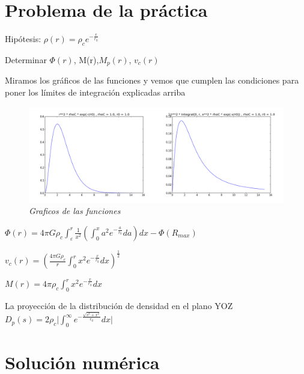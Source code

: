 \documentclass[12pt]{book}
\begin{document}
\section*{Problema de la práctica}
\begin{description}
\item Hipótesis: $\rho(r) = \rho_c e^{-\frac{r}{r_0}} $
\item Determinar $\Phi(r)$, M(r),$M_p(r)$, $v_c(r)$ 

\end{description}


\begin{description}
\item Miramos los gráficos de las funciones y vemos que cumplen las condiciones para poner los límites de integración explicadas arriba
\begin{figure}[!ht]
 \centering
 \includegraphics[scale=0.33]{func12Plot.png}
 \caption{\emph{Graficos de las funciones}}
\end{figure}

\item $\Phi(r) = 4 \pi G \rho_c \int_\varepsilon^r{ \frac{1}{x^2}(\int_0^x{a^2 e^{-\frac{a}{r_0}}da})dx} -\Phi(R_{max})$
\item $v_c(r) = (\frac{4 \pi G \rho_c}{r}\int_0^r{x^2 e^{-\frac{x}{r_0}}dx} )^{\frac{1}{2}}  $ 
\item $M(r) = 4 \pi \rho_c \int_0^r{x^2 e^{-\frac{x}{r_0}}dx}$ 
\item La proyección de la distribución de densidad en el plano YOZ
$D_p(s) = 2 \rho_c \lvert \int_0^\infty{e^{-\frac{\sqrt{s^2 + x^2}}{r_0}} dx}  \rvert$



\end{description}

\section*{Solución numérica}
\end{document}

